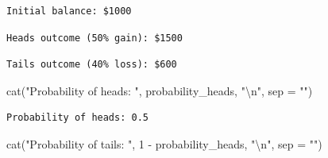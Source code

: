 \documentclass[
  letterpaper,
  DIV=11,
  numbers=noendperiod]{scrartcl}
\newenvironment{Shaded}{\begin{snugshade}}{\end{snugshade}}
\newcommand{\AttributeTok}[1]{\textcolor[rgb]{0.40,0.45,0.13}{#1}}
\newcommand{\DecValTok}[1]{\textcolor[rgb]{0.68,0.00,0.00}{#1}}
\newcommand{\FunctionTok}[1]{\textcolor[rgb]{0.28,0.35,0.67}{#1}}
\newcommand{\NormalTok}[1]{\textcolor[rgb]{0.00,0.23,0.31}{#1}}
\newcommand{\SpecialCharTok}[1]{\textcolor[rgb]{0.37,0.37,0.37}{#1}}
\newcommand{\StringTok}[1]{\textcolor[rgb]{0.13,0.47,0.30}{#1}}
\begin{document}
\begin{verbatim}
Initial balance: $1000
\end{verbatim}

\begin{Shaded}
\end{Shaded}

\begin{verbatim}
Heads outcome (50% gain): $1500
\end{verbatim}

\begin{Shaded}
\end{Shaded}

\begin{verbatim}
Tails outcome (40% loss): $600
\end{verbatim}

\begin{Shaded}
\begin{Highlighting}[]
\FunctionTok{cat}\NormalTok{(}\StringTok{"Probability of heads: "}\NormalTok{, probability\_heads, }\StringTok{"}\SpecialCharTok{\textbackslash{}n}\StringTok{"}\NormalTok{, }\AttributeTok{sep =} \StringTok{""}\NormalTok{)}
\end{Highlighting}
\end{Shaded}

\begin{verbatim}
Probability of heads: 0.5
\end{verbatim}

\begin{Shaded}
\begin{Highlighting}[]
\FunctionTok{cat}\NormalTok{(}\StringTok{"Probability of tails: "}\NormalTok{, }\DecValTok{1} \SpecialCharTok{{-}}\NormalTok{ probability\_heads, }\StringTok{"}\SpecialCharTok{\textbackslash{}n}\StringTok{"}\NormalTok{, }\AttributeTok{sep =} \StringTok{""}\NormalTok{)}
\end{Highlighting}
\end{Shaded}
\end{document}
